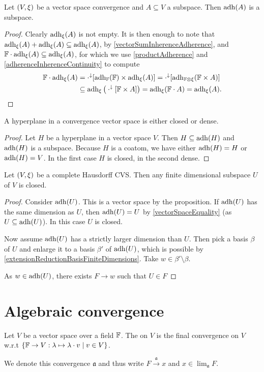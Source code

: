 \begin{proposition}
Let $\left( V,\xi \right)$ be a vector space convergence and $A\subseteq V$ a subspace. Then $\operatorname{adh}(A)$ is a subspace.
\end{proposition}
\begin{proof}
Clearly $\operatorname{adh}_\xi(A)$ is not empty. It is then enough to note that $\operatorname{adh}_\xi(A)+\operatorname{adh}_\xi(A)\subseteq \operatorname{adh}_\xi(A)$, by \ref{vectorSumInherenceAdherence}, and $\mathbb{F}\cdot \operatorname{adh}_\xi(A) \subseteq \operatorname{adh}_\xi(A)$, for which we use \ref{productAdherence} and \ref{adherenceInherenceContinuity} to compute
\begin{align*}
\mathbb{F}\cdot \operatorname{adh}_\xi(A) &= \cdot^\downarrow[\operatorname{adh}_{\mathbb{F}}(\mathbb{F})\times \operatorname{adh}_\xi(A)] = \cdot^\downarrow[\operatorname{adh}_{\mathbb{F}\otimes \xi}(\mathbb{F}\times A)] \\
&\subseteq \operatorname{adh}_{\xi}\big(\cdot^\downarrow[\mathbb{F}\times A]\big) = \operatorname{adh}_{\xi}(\mathbb{F}\cdot A) = \operatorname{adh}_\xi(A).
\end{align*}
\end{proof}
\begin{corollary} \label{hyperplaneClosedDense}
A hyperplane in a convergence vector space is either closed or dense.
\end{corollary}
\begin{proof}
Let $H$ be a hyperplane in a vector space $V$. Then $H \subseteq \operatorname{adh}(H)$ and $\operatorname{adh}(H)$ is a subspace. Because $H$ is a coatom, we have either $\operatorname{adh}(H) = H$ or $\operatorname{adh}(H) = V$. In the first case $H$ is closed, in the second dense.
\end{proof}
\begin{corollary}
Let $\left( V,\xi \right)$ be a complete Hausdorff CVS. Then any finite dimensional subspace $U$ of $V$ is closed.
\end{corollary}
\begin{proof}
Consider $\operatorname{adh}(U)$. This is a vector space by the proposition. If $\operatorname{adh}(U)$ has the same dimension as $U$, then $\operatorname{adh}(U) = U$ by \ref{vectorSpaceEquality} (as $U \subseteq \operatorname{adh}(U)$). In this case $U$ is closed.

Now assume $\operatorname{adh}(U)$ has a strictly larger dimension than $U$. Then pick a basis $\beta$ of $U$ and enlarge it to a basis $\beta'$ of $\operatorname{adh}(U)$, which is possible by \ref{extensionReductionBasisFiniteDimensions}. Take $w\in \beta'\setminus \beta$.

As $w\in\operatorname{adh}(U)$, there exists $F\to w$ such that $U\in F$
\end{proof}


\chapter{Algebraic convergence}
\begin{definition}
Let $V$ be a vector space over a field $\mathbb{F}$. The  on $V$ is the final convergence on $V$ w.r.t $\setbuilder{\F \to V: \lambda\mapsto \lambda \cdot v}{v\in V}$.

We denote this convergence $\mathfrak{a}$ and thus write $F \overset{\mathfrak{a}}{\longrightarrow} x$ and $x\in \lim_\mathfrak{a} F$.
\end{definition}

